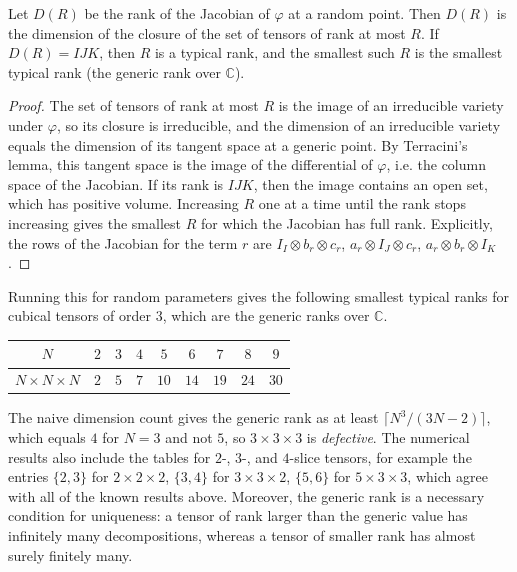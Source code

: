   \begin{theorem}
    Let $D(R)$ be the rank of the Jacobian of $\varphi$ at a random point. Then $D(R)$ is the dimension of the closure of the set of tensors of rank at most $R$. If $D(R) = IJK$, then $R$ is a typical rank, and the smallest such $R$ is the smallest typical rank (the generic rank over $\mathbb{C}$).
  \end{theorem}
  \begin{proof}
    The set of tensors of rank at most $R$ is the image of an irreducible variety under $\varphi$, so its closure is irreducible, and the dimension of an irreducible variety equals the dimension of its tangent space at a generic point. By Terracini's lemma, this tangent space is the image of the differential of $\varphi$, i.e. the column space of the Jacobian. If its rank is $IJK$, then the image contains an open set, which has positive volume. Increasing $R$ one at a time until the rank stops increasing gives the smallest $R$ for which the Jacobian has full rank. Explicitly, the rows of the Jacobian for the term $r$ are $I_I \otimes b_r \otimes c_r$, $a_r \otimes I_J \otimes c_r$, $a_r \otimes b_r \otimes I_K$.
  \end{proof}

  Running this for random parameters gives the following smallest typical ranks for cubical tensors of order $3$, which are the generic ranks over $\mathbb{C}$.
  \begin{center}
    \begin{tabular}{c|cccccccc}
      $N$ & $2$ & $3$ & $4$ & $5$ & $6$ & $7$ & $8$ & $9$ \\ \hline
      $N \times N \times N$ & $2$ & $5$ & $7$ & $10$ & $14$ & $19$ & $24$ & $30$ \\
    \end{tabular}
  \end{center}
  The naive dimension count gives the generic rank as at least $\lceil N^3 / (3N - 2) \rceil$, which equals $4$ for $N = 3$ and not $5$, so $3 \times 3 \times 3$ is \textit{defective}. The numerical results also include the tables for $2$-, $3$-, and $4$-slice tensors, for example the entries $\{2,3\}$ for $2 \times 2 \times 2$, $\{3, 4\}$ for $3 \times 3 \times 2$, $\{5, 6\}$ for $5 \times 3 \times 3$, which agree with all of the known results above. Moreover, the generic rank is a necessary condition for uniqueness: a tensor of rank larger than the generic value has infinitely many decompositions, whereas a tensor of smaller rank has almost surely finitely many.

